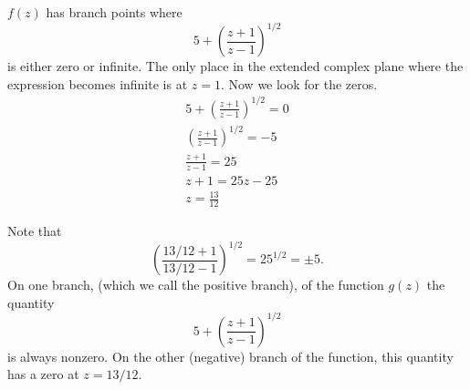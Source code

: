 {\begin{Solution}
\begin{enumerate}


    $f(z)$ has branch points where
    \[
    5 + \left( \frac{z+1}{z-1} \right)^{1/2}
    \]
    is either zero or infinite.  The only place in the extended complex plane
    where the expression becomes infinite is at $z = 1$.  Now we look for 
    the zeros.
    \begin{gather*}
      5 + \left( \frac{z+1}{z-1} \right)^{1/2} = 0
      \\
      \left( \frac{z+1}{z-1} \right)^{1/2} = -5
      \\
      \frac{z+1}{z-1} = 25
      \\
      z + 1 = 25 z - 25 
      \\
      z = \frac{13}{12}
    \end{gather*}

    Note that 
    \[
    \left( \frac{13/12 + 1}{13/12 - 1} \right)^{1/2} = 25^{1/2} = \pm 5.
    \]
    On one branch, (which we call the positive branch), of the function $g(z)$
    the quantity 
    \[
    5 + \left( \frac{z+1}{z-1} \right)^{1/2}
    \]
    is always nonzero.  On the other (negative) branch of the function, 
    this quantity has a zero at $z = 13/12$.    



\end{enumerate}
\end{Solution}}
